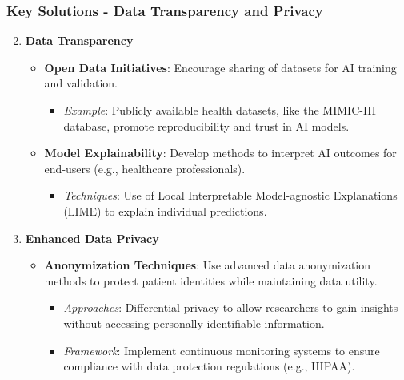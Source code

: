 \documentclass[aspectratio=169]{beamer}
\begin{document}
\begin{frame}[fragile]
    \frametitle{Key Solutions - Data Transparency and Privacy}
    \begin{enumerate}
        \setcounter{enumi}{1}
        \item \textbf{Data Transparency}
            \begin{itemize}
                \item \textbf{Open Data Initiatives}: Encourage sharing of datasets for AI training and validation.
                \begin{itemize}
                    \item \textit{Example}: Publicly available health datasets, like the MIMIC-III database, promote reproducibility and trust in AI models.
                \end{itemize}
                \item \textbf{Model Explainability}: Develop methods to interpret AI outcomes for end-users (e.g., healthcare professionals).
                \begin{itemize}
                    \item \textit{Techniques}: Use of Local Interpretable Model-agnostic Explanations (LIME) to explain individual predictions.
                \end{itemize}
            \end{itemize}

        \item \textbf{Enhanced Data Privacy}
            \begin{itemize}
                \item \textbf{Anonymization Techniques}: Use advanced data anonymization methods to protect patient identities while maintaining data utility.
                \begin{itemize}
                    \item \textit{Approaches}: Differential privacy to allow researchers to gain insights without accessing personally identifiable information.
                    \item \textit{Framework}: Implement continuous monitoring systems to ensure compliance with data protection regulations (e.g., HIPAA).
                \end{itemize}
            \end{itemize}
    \end{enumerate}
\end{frame}
\end{document}
